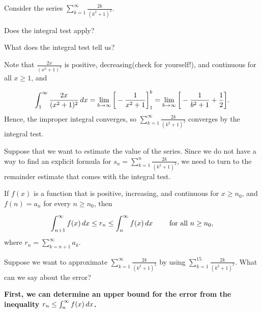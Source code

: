 \documentclass{ximera}
\author{Jim Talamo}
\begin{document}
\begin{exercise}

Consider the series $\sum_{k=1}^{\infty} \frac{2k}{(k^2+1)^2}$.  

Does the integral test apply?

\begin{multipleChoice}
\end{multipleChoice}

What does the integral test tell us?
\begin{multipleChoice}
\end{multipleChoice}

\begin{feedback}
Note that $\frac{2x}{(x^2+1)^2}$ is positive, decreasing(check for yourself!), and continuous for all $x \geq 1$, and

\[
\int_1^\infty \frac{2x}{(x^2+1)^2} \mathop{}\!d x = \lim_{b \to \infty} \bigg[ -\frac{1}{x^2+1} \bigg]_1^b = \lim_{b \to \infty} \bigg[ -\frac{1}{b^2+1}+\frac{1}{2} \bigg].
\]
Hence, the improper integral converges, so $\sum_{k=1}^{\infty}  \frac{2k}{(k^2+1)^2}$ converges by the integral test.  

Suppose that we want to estimate the value of the series.  Since we do not have a way to find an explicit formula for $s_n=\sum_{k=1}^n \frac{2k}{(k^2+1)^2}$, we need to turn to the remainder estimate that comes with the integral test.

\begin{theorem}
If $f(x)$ is a function that is positive, increasing, and continuous for $x \geq n_0$,  and $f(n) = a_n$ for every $n \geq n_0$, then 

\[
\int_{n+1}^{\infty} f(x) \mathop{}\!d x \leq  r_n \leq \int_{n}^{\infty} f(x) \mathop{}\!d x \qquad \textrm{ for all } n \geq n_0,
\]
where $r_n = \sum_{k=n+1}^{\infty} a_k$.
\end{theorem}

\end{feedback}


\begin{exercise}
Suppose we want to approximate $\sum_{k=1}^{\infty} \frac{2k}{(k^2+1)^2}$ by using $\sum_{k=1}^{15} \frac{2k}{(k^2+1)^2}$.  What can we say about the error?

\textbf{First, we can determine an upper bound for the error from the inequality $ r_n \leq \int_{n}^{\infty} f(x) \mathop{}\!d x$. } 


\end{exercise}
\end{exercise}
\end{document}
